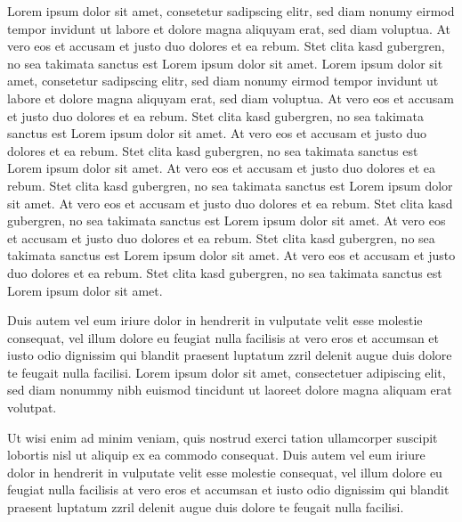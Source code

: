 \documentclass[11pt, ngerman]{g-brief2}
\begin{document}
\begin{g-brief}
Lorem ipsum dolor sit amet, consetetur sadipscing elitr, sed diam nonumy eirmod tempor invidunt ut labore et dolore magna aliquyam erat, sed diam voluptua. At vero eos et accusam et justo duo dolores et ea rebum. Stet clita kasd gubergren, no sea takimata sanctus est Lorem ipsum dolor sit amet. Lorem ipsum dolor sit amet, consetetur sadipscing elitr, sed diam nonumy eirmod tempor invidunt ut labore et dolore magna aliquyam erat, sed diam voluptua. At vero eos et accusam et justo duo dolores et ea rebum. Stet clita kasd gubergren, no sea takimata sanctus est Lorem ipsum dolor sit amet.
 At vero eos et accusam et justo duo dolores et ea rebum. Stet clita kasd gubergren, no sea takimata sanctus est Lorem ipsum dolor sit amet.
 At vero eos et accusam et justo duo dolores et ea rebum. Stet clita kasd gubergren, no sea takimata sanctus est Lorem ipsum dolor sit amet.
 At vero eos et accusam et justo duo dolores et ea rebum. Stet clita kasd gubergren, no sea takimata sanctus est Lorem ipsum dolor sit amet.
 At vero eos et accusam et justo duo dolores et ea rebum. Stet clita kasd gubergren, no sea takimata sanctus est Lorem ipsum dolor sit amet.
 At vero eos et accusam et justo duo dolores et ea rebum. Stet clita kasd gubergren, no sea takimata sanctus est Lorem ipsum dolor sit amet.

Duis autem vel eum iriure dolor in hendrerit in vulputate velit esse molestie consequat, vel illum dolore eu feugiat nulla facilisis at vero eros et accumsan et iusto odio dignissim qui blandit praesent luptatum zzril delenit augue duis dolore te feugait nulla facilisi. Lorem ipsum dolor sit amet, consectetuer adipiscing elit, sed diam nonummy nibh euismod tincidunt ut laoreet dolore magna aliquam erat volutpat. 

Ut wisi enim ad minim veniam, quis nostrud exerci tation ullamcorper suscipit lobortis nisl ut aliquip ex ea commodo consequat. Duis autem vel eum iriure dolor in hendrerit in vulputate velit esse molestie consequat, vel illum dolore eu feugiat nulla facilisis at vero eros et accumsan et iusto odio dignissim qui blandit praesent luptatum zzril delenit augue duis dolore te feugait nulla facilisi.

\end{g-brief}
\end{document}
